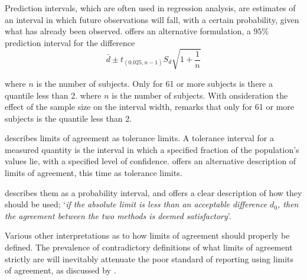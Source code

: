 \documentclass[12pt, a4paper]{report}
\theoremstyle{plain}
\theoremstyle{definition}
\theoremstyle{remark}
\begin{document}
Prediction intervals, which are often used in
regression analysis, are estimates of an interval in which future
observations will fall, with a certain probability, given what has
already been observed. \citet{BXC2008} offers an alternative
formulation, a $95\%$ prediction interval for the difference
\begin{equation}
\bar{d} \pm t_{(0.025, n-1)}S_{d} \sqrt{1+\frac{1}{n}}
\end{equation}

\noindent where $n$ is the number of subjects. Only for 61 or more
subjects is there a quantile less than 2.
\noindent where $n$ is the number of subjects. With onsideration the effect of the sample size on the interval
width, \citet{BXC2008} remarks that only for 61 or more subjects is the quantile less than 2.

\citet{luiz} describes limits of agreement as tolerance limits. A
tolerance interval for a measured quantity is the interval in
which a specified fraction of the population's values lie, with a
specified level of confidence. \citet{luiz} offers an alternative description of limits of agreement, this time as tolerance limits. 

\citet{Barnhart} describes them as a probability interval, and offers a clear description of how they should be used; `\textit{if the absolute limit is less than an acceptable difference $d_{0}$, then the agreement between the two methods is deemed satisfactory}'.

Various other interpretations as to how limits of agreement should properly be defined. The prevalence of contradictory definitions of what limits of agreement strictly are will inevitably attenuate the poor standard of reporting using limits of agreement, as discussed by \citet{mantha}.







\end{document}
